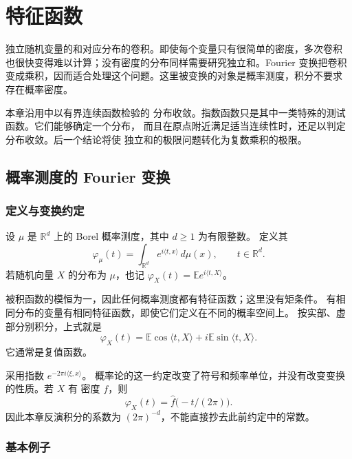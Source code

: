 \chapter{特征函数}
\label{chap:characteristic-functions}

独立随机变量的和对应分布的卷积。即使每个变量只有很简单的密度，多次卷积
也很快变得难以计算；没有密度的分布同样需要研究独立和。Fourier 变换把卷积
变成乘积，因而适合处理这个问题。这里被变换的对象是概率测度，积分不要求
存在概率密度。

本章沿用中以有界连续函数检验的
分布收敛。指数函数只是其中一类特殊的测试函数。它们能够确定一个分布，
而且在原点附近满足适当连续性时，还足以判定分布收敛。后一个结论将使
独立和的极限问题转化为复数乘积的极限。

\section{概率测度的 Fourier 变换}
\label{sec:characteristic-definition}

\subsection{定义与变换约定}

\begin{definition}
\label{def:characteristic-function}
设 $\mu$ 是 $\mathbb R^d$ 上的 Borel 概率测度，其中 $d\ge1$ 为有限整数。
定义其
\[
 \varphi_\mu(t)=\int_{\mathbb R^d}e^{i\langle t,x\rangle}\,d\mu(x),
 \qquad t\in\mathbb R^d.
\]
若随机向量 $X$ 的分布为 $\mu$，也记
$\varphi_X(t)=\mathbb E e^{i\langle t,X\rangle}$。
\end{definition}

被积函数的模恒为一，因此任何概率测度都有特征函数；这里没有矩条件。
有相同分布的变量有相同特征函数，即使它们定义在不同的概率空间上。
按实部、虚部分别积分，上式就是
\[
 \varphi_X(t)=\mathbb E\cos\langle t,X\rangle
       +i\mathbb E\sin\langle t,X\rangle.
\]
它通常是复值函数。

采用指数 $e^{-2\pi i\langle\xi,x\rangle}$。
概率论的这一约定改变了符号和频率单位，并没有改变变换的性质。若 $X$ 有
密度 $f$，则
\[
 \varphi_X(t)=\widehat f\bigl(-t/(2\pi)\bigr).
\]
因此本章反演积分的系数为 $(2\pi)^{-d}$，不能直接抄去此前约定中的常数。

\subsection{基本例子}

